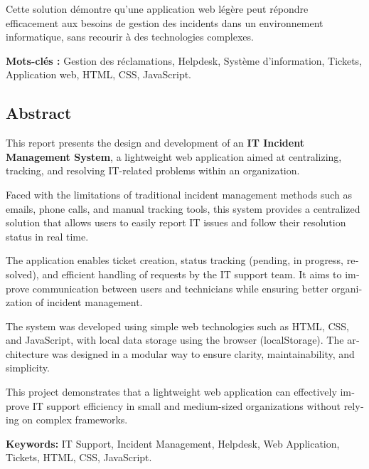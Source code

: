 \documentclass[12pt,a4paper,twoside]{report}
\begin{document}
Cette solution démontre qu'une application web légère peut répondre efficacement aux besoins de gestion des incidents dans un environnement informatique, sans recourir à des technologies complexes.

\textbf{Mots-clés :} Gestion des réclamations, Helpdesk, Système d'information, Tickets, Application web, HTML, CSS, JavaScript.

\vspace{1cm}

\begin{otherlanguage}{english}
\chapter*{Abstract}

This report presents the design and development of an \textbf{IT Incident Management System}, a lightweight web application aimed at centralizing, tracking, and resolving IT-related problems within an organization.

Faced with the limitations of traditional incident management methods such as emails, phone calls, and manual tracking tools, this system provides a centralized solution that allows users to easily report IT issues and follow their resolution status in real time.

The application enables ticket creation, status tracking (pending, in progress, resolved), and efficient handling of requests by the IT support team. It aims to improve communication between users and technicians while ensuring better organization of incident management.

The system was developed using simple web technologies such as HTML, CSS, and JavaScript, with local data storage using the browser (localStorage). The architecture was designed in a modular way to ensure clarity, maintainability, and simplicity.

This project demonstrates that a lightweight web application can effectively improve IT support efficiency in small and medium-sized organizations without relying on complex frameworks.

\textbf{Keywords:} IT Support, Incident Management, Helpdesk, Web Application, Tickets, HTML, CSS, JavaScript.
\end{otherlanguage}

\renewcommand{\listtablename}{Liste des tableaux}
\renewcommand{\listfigurename}{Liste des figures}
\end{document}
